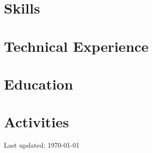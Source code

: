 \documentclass[10pt]{article}
\begin{document}
\pagestyle{others}
\thispagestyle{first_page}



\section{Skills}


\section{Technical Experience}


\section{Education}


\section{Activities}


\vfill
\begin{center}
{\scriptsize\color{black!50}Last updated: \today}
\end{center}
\end{document}
